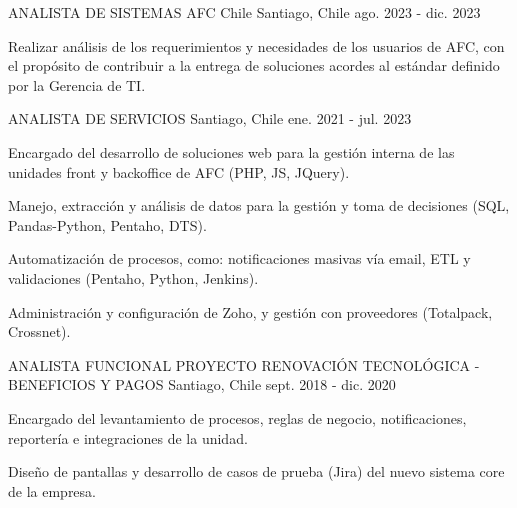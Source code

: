 

\begin{cventries}

  \cventry
  {ANALISTA DE SISTEMAS} %
  {AFC Chile} %
  {Santiago, Chile} %
  {ago. 2023 - dic. 2023} %
  {
    \begin{cvitems} %
      \item {Realizar análisis de los requerimientos y necesidades de los usuarios de AFC, con el propósito de contribuir a la entrega de soluciones acordes al estándar definido por la Gerencia de TI.} 
    \end{cvitems}
  }%

  \cventry
    {ANALISTA DE SERVICIOS} %
    {} %
    {Santiago, Chile} %
    {ene. 2021 - jul. 2023} %
    {
      \begin{cvitems} %
        \item {Encargado del desarrollo de soluciones web para la gestión interna de las unidades front y backoffice de AFC (PHP, JS, JQuery).} 
        \item {Manejo, extracción y análisis de datos para la gestión y toma de decisiones (SQL, Pandas-Python, Pentaho, DTS).}
        \item {Automatización de procesos, como: notificaciones masivas vía email, ETL y validaciones (Pentaho, Python, Jenkins).}
        \item {Administración y configuración de Zoho, y gestión con proveedores (Totalpack, Crossnet).}
      \end{cvitems}
    }%

  \cventry
    {ANALISTA FUNCIONAL PROYECTO RENOVACIÓN TECNOLÓGICA - BENEFICIOS Y PAGOS} %
    {} %
    {Santiago, Chile} %
    {sept. 2018 - dic. 2020} %
    {
      \begin{cvitems} %
        \item {Encargado del levantamiento de procesos, reglas de negocio, notificaciones, reportería e integraciones de la unidad.}
        \item {Diseño de pantallas y desarrollo de casos de prueba (Jira) del nuevo sistema core de la empresa.}
      \end{cvitems}
    }%


\end{cventries}
